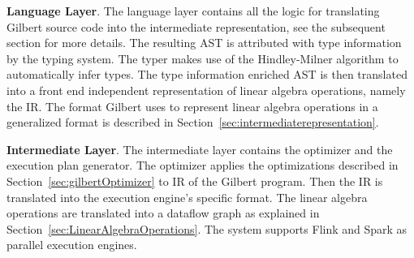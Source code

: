\textbf{Language Layer}. The language layer contains all the logic for translating Gilbert source code into the intermediate representation, see the subsequent section for more details. %
The resulting AST is attributed with type information by the typing system. The typer makes use of the Hindley-Milner algorithm to automatically infer types.%
The type information enriched AST is then translated into a front end independent representation of linear algebra operations, namely the IR. The format Gilbert uses to represent linear algebra operations in a generalized format is described in Section~\ref{sec:intermediaterepresentation}.

\textbf{Intermediate Layer}. The intermediate layer contains the optimizer and the execution plan generator. The optimizer applies the optimizations described in Section~\ref{sec:gilbertOptimizer} to IR of the Gilbert program. Then the IR is translated into the execution engine's specific format. The linear algebra operations are translated into a dataflow graph as explained in Section~\ref{sec:LinearAlgebraOperations}. The system supports Flink and Spark as parallel execution engines.

